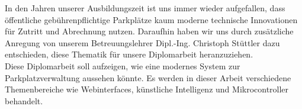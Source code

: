 In den Jahren unserer Ausbildungszeit ist uns immer wieder aufgefallen, dass
öffentliche gebührenpflichtige Parkplätze kaum moderne technische Innovationen für Zutritt und Abrechnung nutzen.
Daraufhin haben wir uns durch zusätzliche Anregung von unserem
Betreuungslehrer Dipl.-Ing. Christoph Stüttler dazu entschieden, diese Thematik
für unsere Diplomarbeit heranzuziehen.\\

Diese Diplomarbeit soll aufzeigen, wie eine modernes System zur
Parkplatzverwaltung aussehen könnte. Es werden in dieser Arbeit verschiedene
Themenbereiche wie Webinterfaces, künstliche Intelligenz und Mikrocontroller
behandelt.